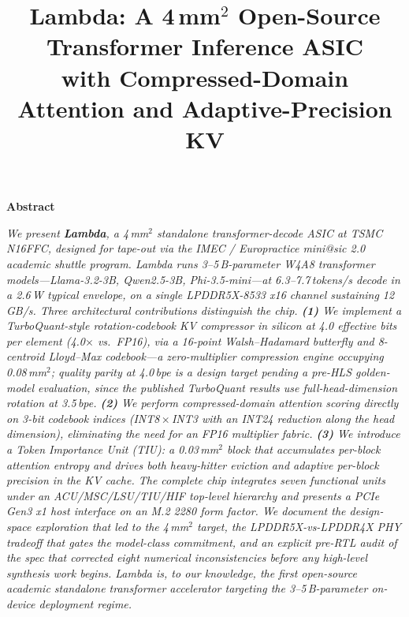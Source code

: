 \documentclass[conference]{IEEEtran}
\renewenvironment{abstract}
  {\par\vspace{4pt}\noindent\begin{center}\textbf{\large Abstract}\end{center}\vspace{-2pt}\par\itshape\small}
  {\par\vspace{6pt}\upshape\normalsize}
\begin{document}
\title{Lambda: A 4\,mm$^2$ Open-Source Transformer Inference ASIC \\ with Compressed-Domain Attention and Adaptive-Precision KV}

\author{
}

\maketitle

\begin{abstract}
\boldmath
We present \textbf{Lambda}, a 4\,mm$^2$ standalone transformer-decode ASIC at TSMC N16FFC, designed for tape-out via the IMEC / Europractice mini@sic 2.0 academic shuttle program. Lambda runs 3--5\,B-parameter W4A8 transformer models---Llama-3.2-3B, Qwen2.5-3B, Phi-3.5-mini---at 6.3--7.7\,tokens/s decode in a 2.6\,W typical envelope, on a single LPDDR5X-8533 x16 channel sustaining 12\,GB/s. Three architectural contributions distinguish the chip. \textbf{(1)} We implement a TurboQuant-style rotation-codebook KV compressor in silicon at 4.0 effective bits per element (4.0$\times$ vs.\ FP16), via a 16-point Walsh--Hadamard butterfly and 8-centroid Lloyd--Max codebook---a zero-multiplier compression engine occupying 0.08\,mm$^2$; quality parity at 4.0\,bpe is a design target pending a pre-HLS golden-model evaluation, since the published TurboQuant results use full-head-dimension rotation at 3.5\,bpe. \textbf{(2)} We perform compressed-domain attention scoring directly on 3-bit codebook indices (INT8\,$\times$\,INT3 with an INT24 reduction along the head dimension), eliminating the need for an FP16 multiplier fabric. \textbf{(3)} We introduce a Token Importance Unit (TIU): a 0.03\,mm$^2$ block that accumulates per-block attention entropy and drives both heavy-hitter eviction and adaptive per-block precision in the KV cache. The complete chip integrates seven functional units under an ACU/MSC/LSU/TIU/HIF top-level hierarchy and presents a PCIe Gen3 x1 host interface on an M.2 2280 form factor. We document the design-space exploration that led to the 4\,mm$^2$ target, the LPDDR5X-vs-LPDDR4X PHY tradeoff that gates the model-class commitment, and an explicit pre-RTL audit of the spec that corrected eight numerical inconsistencies before any high-level synthesis work begins. Lambda is, to our knowledge, the first open-source academic standalone transformer accelerator targeting the 3--5\,B-parameter on-device deployment regime.
\unboldmath
\end{abstract}
\end{document}
